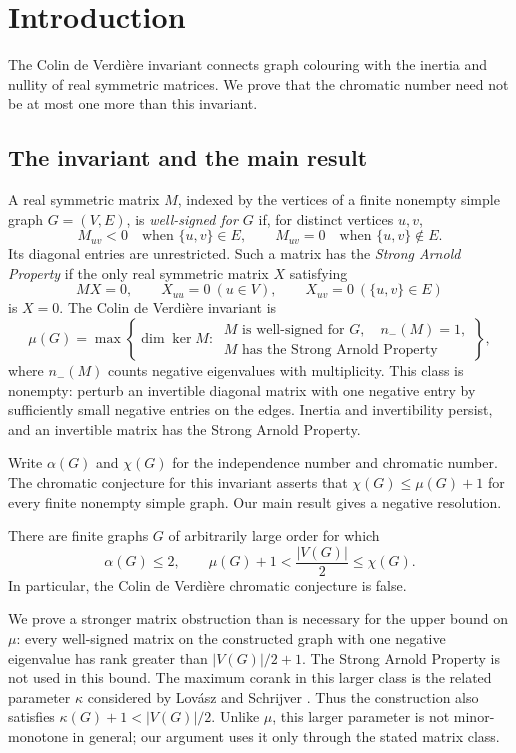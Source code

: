 \section{Introduction}\label{sec:introduction}

The Colin de Verdière invariant connects graph colouring with the
inertia and nullity of real symmetric matrices. We prove that the
chromatic number need not be at most one more than this invariant.

\subsection{The invariant and the main result}

A real symmetric matrix \(M\), indexed by the vertices of a finite
nonempty simple graph \(G=(V,E)\), is \emph{well-signed for \(G\)} if, for
distinct vertices \(u,v\),
\[
 M_{uv}<0\quad\text{when }\{u,v\}\in E,\qquad
 M_{uv}=0\quad\text{when }\{u,v\}\notin E.
\]
Its diagonal entries are unrestricted. Such a matrix has the
\emph{Strong Arnold Property} if the only real symmetric matrix \(X\)
satisfying
\[
 MX=0,\qquad X_{uu}=0\ (u\in V),\qquad
 X_{uv}=0\ (\{u,v\}\in E)
\]
is \(X=0\). The Colin de Verdière invariant is
\[
 \mu(G)=\max\left\{\dim\ker M:\ 
 \begin{array}{l}
 M\text{ is well-signed for }G,\quad n_-(M)=1,\\
 M\text{ has the Strong Arnold Property}
 \end{array}\right\},
\]
where \(n_-(M)\) counts negative eigenvalues with multiplicity.
This class is nonempty: perturb an invertible diagonal matrix with
one negative entry by sufficiently small negative entries on the
edges. Inertia and invertibility persist, and an invertible matrix
has the Strong Arnold Property.

Write \(\alpha(G)\) and \(\chi(G)\) for the independence number and
chromatic number. The chromatic conjecture for this invariant asserts
that \(\chi(G)\le\mu(G)+1\) for every finite nonempty simple graph.
Our main result gives a negative resolution.

\begin{theorem}\label{thm:main}
There are finite graphs \(G\) of arbitrarily large order for which
\[
 \alpha(G)\le2,\qquad
 \mu(G)+1<\frac{|V(G)|}{2}\le\chi(G).
\]
In particular, the Colin de Verdière chromatic conjecture is false.
\end{theorem}

We prove a stronger matrix obstruction than is necessary for the
upper bound on \(\mu\): every well-signed matrix on the constructed
graph with one negative eigenvalue has rank greater than
\(|V(G)|/2+1\). The Strong Arnold Property is not used in this bound.
The maximum corank in this larger class is the related parameter
\(\kappa\) considered by Lovász and Schrijver
\citep[pp.~572--574]{lovaszschrijver2017}. Thus the construction also
satisfies \(\kappa(G)+1<|V(G)|/2\). Unlike \(\mu\), this larger
parameter is not minor-monotone in general; our argument uses it only
through the stated matrix class.


